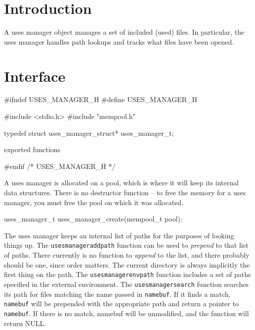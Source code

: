 \section{Introduction}

A uses manager object manages a set of included (used) files.
In particular, the uses manager handles path lookups and
tracks what files have been opened.


\section{Interface}

\endmoddef
#ifndef USES_MANAGER_H
#define USES_MANAGER_H

#include <stdio.h>
#include "mempool.h"

typedef struct uses_manager_struct* uses_manager_t;

\LA{}exported functions~{\nwtagstyle{}}\RA{}

#endif /* USES_MANAGER_H */
\nwendcode{}\nwdocspar

A uses manager is allocated on a pool, which is where it will
keep its internal data structures.  There is no destructor
function -- to free the memory for a uses manager, you must
free the pool on which it was allocated.

\nwenddocs{}\endmoddef
uses_manager_t uses_manager_create(mempool_t pool);

\nwendcode{}\nwdocspar

The uses manager keeps an internal list of paths for the purposes
of looking things up.  The {\tt{}uses{}manager{}addpath} function can
be used to \emph{prepend} to that list of paths.  There currently is no
function to \emph{append} to the list, and there probably
should be one, since order matters.  The current directory is
always implicitly the first thing on the path.  The {\tt{}uses{}manager{}envpath}
function includes a set of paths specified in the external environment.
The {\tt{}uses{}manager{}search} function searches its path for files
matching the name passed in {\tt{}namebuf}.
If it finds a match, {\tt{}namebuf} will be prepended with the appropriate
path and return a pointer to {\tt{}namebuf}.  If there is no match,
namebuf will be unmodified, and the function will return NULL.


